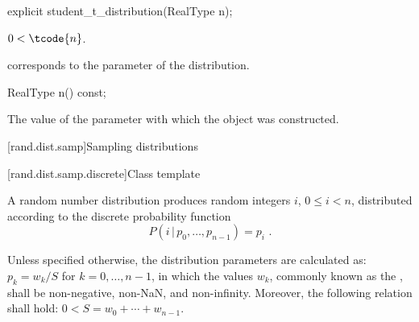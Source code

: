 %
\begin{itemdecl}
explicit student_t_distribution(RealType n);
\end{itemdecl}

\begin{itemdescr}
\pnum
\expects
$0 < \tcode{n}$.

\pnum
\remarks
{} corresponds to the parameter of the distribution.
\end{itemdescr}

%
\begin{itemdecl}
RealType n() const;
\end{itemdecl}

\begin{itemdescr}
\pnum
\returns
The value of the  parameter
 with which the object was constructed.
\end{itemdescr}%
%



[rand.dist.samp]{Sampling distributions}%
%



[rand.dist.samp.discrete]{Class template }%
%

\pnum
A  random number distribution
produces random integers $i$, $0 \leq i < n$,
distributed according to
the discrete probability function%
\[  P(i \,|\, p_0, \dotsc, p_{n-1}) = p_i \text{ .} \]

\pnum
Unless specified otherwise,
the distribution parameters are calculated as:
$p_k = {w_k / S}$ for $k = 0, \dotsc, n - 1$,
in which the values $w_k$,
commonly known as the %
, shall be non-negative, non-NaN, and non-infinity.
Moreover, the following relation shall hold:
$0 < S = w_0 + \dotsb + w_{n - 1}$.

